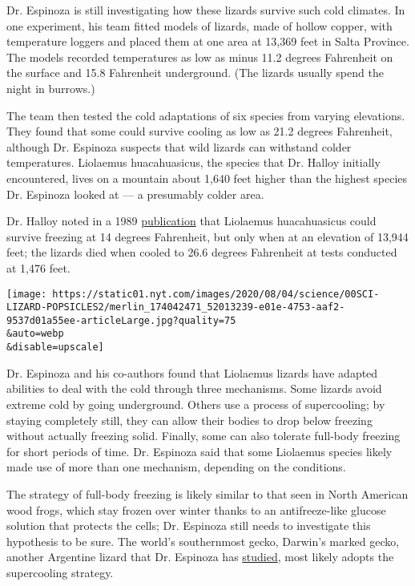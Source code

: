 Dr. Espinoza is still investigating how these lizards survive such cold
climates. In one experiment, his team fitted models of lizards, made of
hollow copper, with temperature loggers and placed them at one area at
13,369 feet in Salta Province. The models recorded temperatures as low
as minus 11.2 degrees Fahrenheit on the surface and 15.8 Fahrenheit
underground. (The lizards usually spend the night in burrows.)

The team then tested the cold adaptations of six species from varying
elevations. They found that some could survive cooling as low as 21.2
degrees Fahrenheit, although Dr. Espinoza suspects that wild lizards can
withstand colder temperatures. Liolaemus huacahuasicus, the species that
Dr. Halloy initially encountered, lives on a mountain about 1,640 feet
higher than the highest species Dr. Espinoza looked at --- a presumably
colder area.

Dr. Halloy noted in a 1989
\href{https://scholarspace.manoa.hawaii.edu/bitstream/10125/1214/v43n2-170-184.pdf}{publication}
that Liolaemus huacahuasicus could survive freezing at 14 degrees
Fahrenheit, but only when at an elevation of 13,944 feet; the lizards
died when cooled to 26.6 degrees Fahrenheit at tests conducted at 1,476
feet.

\texttt{[image: https://static01.nyt.com/images/2020/08/04/science/00SCI-LIZARD-POPSICLES2/merlin\_174042471\_52013239-e01e-4753-aaf2-9537d01a55ee-articleLarge.jpg?quality=75\\\&auto=webp\\\&disable=upscale]}

Dr. Espinoza and his co-authors found that Liolaemus lizards have
adapted abilities to deal with the cold through three mechanisms. Some
lizards avoid extreme cold by going underground. Others use a process of
supercooling; by staying completely still, they can allow their bodies
to drop below freezing without actually freezing solid. Finally, some
can also tolerate full-body freezing for short periods of time. Dr.
Espinoza said that some Liolaemus species likely made use of more than
one mechanism, depending on the conditions.

The strategy of full-body freezing is likely similar to that seen in
North American wood frogs, which stay frozen over winter thanks to an
antifreeze-like glucose solution that protects the cells; Dr. Espinoza
still needs to investigate this hypothesis to be sure. The world's
southernmost gecko, Darwin's marked gecko, another Argentine lizard that
Dr. Espinoza has
\href{https://www.sciencedirect.com/science/article/abs/pii/S030645651300020X}{studied},
most likely adopts the supercooling strategy.

